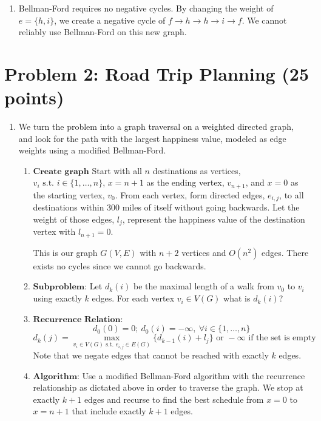 \documentclass[12pt]{article}
\newcommand{\st}{\text{ s.t. }}
\newcommand{\tor}{\text{ or }}
\begin{document}
\begin{enumerate}
\item[(b)] Bellman-Ford requires no negative cycles. By changing the weight of $e= \{h,i\}$, we create a negative cycle of $f \rightarrow h \rightarrow h \rightarrow i \rightarrow f$. We cannot reliably use Bellman-Ford on this new graph. 

\end{enumerate}

\section*{Problem 2: Road Trip Planning (25 points)}
\begin{enumerate}
\item[(a)] We turn the problem into a graph traversal on a weighted directed graph, and look for the path with the largest happiness value, modeled as edge weights using a modified Bellman-Ford.
  \begin{enumerate}
    \item[]$\textbf{Create graph}$ Start with all $n$ destinations as vertices, $v_i \st i \in \{1, \dots, n\}$, $x = n + 1$ as the ending vertex, $v_{n+1}$, and $x = 0$ as the starting vertex, $v_0$. From each vertex, form directed edges, $e_{i, j}$, to all destinations within $300$ miles of itself without going backwards. Let the weight of those edges, $l_{j}$, represent the happiness value of the destination vertex with $l_{n+1} = 0$.
    
    This is our graph $G(V, E)$ with $n+2$ vertices and $O(n^2)$ edges. There exists no cycles since we cannot go backwards.

    \item[]$\textbf{Subproblem:}$ Let $d_k(i)$ be the maximal length of a walk from $v_0$ to $v_i$ using exactly $k$ edges. For each vertex $v_i \in V(G)$ what is $d_k(i)$?
    \item[]$\textbf{Recurrence Relation:}$ 
    \[d_0(0) = 0; ~d_0(i) = -\infty, ~\forall i \in \{1, \dots, n\}\]
    \[d_k(j) = \max_{v_i \in V(G) \st e_{i,j} \in E(G)} \{d_{k-1}(i) + l_{j}\} \tor -\infty \text{ if the set is empty}\]
    Note that we negate edges that cannot be reached with exactly $k$ edges. 

    \item[]$\textbf{Algorithm:}$ Use a modified Bellman-Ford algorithm with the recurrence relationship as dictated above in order to traverse the graph. We stop at exactly $k+1$ edges and recurse to find the best schedule from $x = 0$ to $x = n+1$ that include exactly $k+1$ edges.


\end{enumerate}
\end{enumerate}
\end{document}
